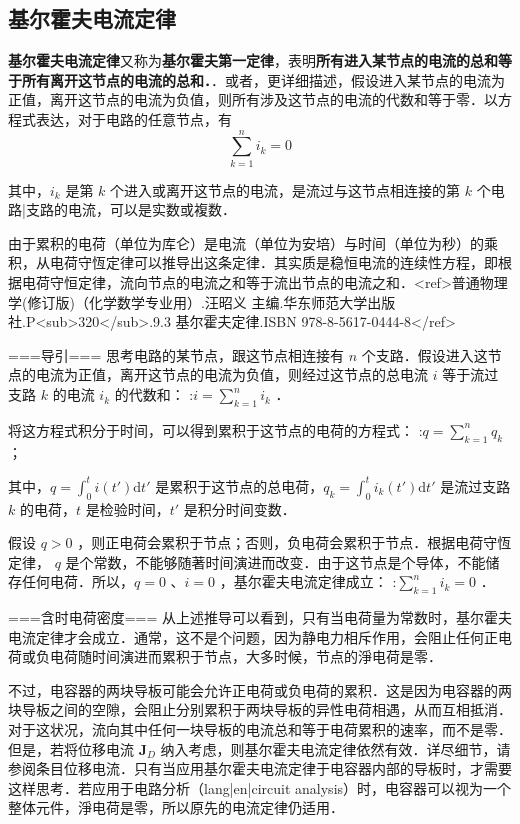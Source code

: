 
\subsection{基尔霍夫电流定律}

\textbf{基尔霍夫电流定律}又称为\textbf{基尔霍夫第一定律}，表明\textbf{所有进入某节点的电流的总和等于所有离开这节点的电流的总和．}．或者，更详细描述，假设进入某节点的电流为正值，离开这节点的电流为负值，则所有涉及这节点的电流的代数和等于零．以方程式表达，对于电路的任意节点，有
\begin{equation}
\sum_{k=1}^n i_k =0
\end{equation}

其中，$i_k$ 是第 $k$ 个进入或离开这节点的电流，是流过与这节点相连接的第 $k$ 个电路|支路的电流，可以是实数或複数．

由于累积的电荷（单位为库仑）是电流（单位为安培）与时间（单位为秒）的乘积，从电荷守恆定律可以推导出这条定律．其实质是稳恒电流的连续性方程，即根据电荷守恒定律，流向节点的电流之和等于流出节点的电流之和．<ref>普通物理学(修订版)（化学数学专业用）.汪昭义 主编.华东师范大学出版社.P<sub>320</sub>.9.3 基尔霍夫定律.ISBN 978-8-5617-0444-8</ref>

===导引===
思考电路的某节点，跟这节点相连接有 $n$ 个支路．假设进入这节点的电流为正值，离开这节点的电流为负值，则经过这节点的总电流 $i$ 等于流过支路 $k$ 的电流 $i_k$ 的代数和：
:$i=\sum_{k=1}^n i_k$ ．

将这方程式积分于时间，可以得到累积于这节点的电荷的方程式：
:$q=\sum_{k=1}^n q_k$ ；

其中，$q=\int_0^t i(t') \mathrm{d}t'$ 是累积于这节点的总电荷，$q_k=\int_0^t i_k(t') \mathrm{d}t'$ 是流过支路 $k$ 的电荷，$t$ 是检验时间，$t'$ 是积分时间变数．

假设 $q>0$ ，则正电荷会累积于节点；否则，负电荷会累积于节点．根据电荷守恆定律， $q$ 是个常数，不能够随著时间演进而改变．由于这节点是个导体，不能储存任何电荷．所以，$q=0$ 、$i=0$ ，基尔霍夫电流定律成立：
:$\sum_{k=1}^n i_k =0$ ．

===含时电荷密度===
从上述推导可以看到，只有当电荷量为常数时，基尔霍夫电流定律才会成立．通常，这不是个问题，因为静电力相斥作用，会阻止任何正电荷或负电荷随时间演进而累积于节点，大多时候，节点的淨电荷是零．

不过，电容器的两块导板可能会允许正电荷或负电荷的累积．这是因为电容器的两块导板之间的空隙，会阻止分别累积于两块导板的异性电荷相遇，从而互相抵消．对于这状况，流向其中任何一块导板的电流总和等于电荷累积的速率，而不是零．但是，若将位移电流 $\mathbf{J}_D$ 纳入考虑，则基尔霍夫电流定律依然有效．详尽细节，请参阅条目位移电流．只有当应用基尔霍夫电流定律于电容器内部的导板时，才需要这样思考．若应用于电路分析（lang|en|circuit analysis）时，电容器可以视为一个整体元件，淨电荷是零，所以原先的电流定律仍适用．

